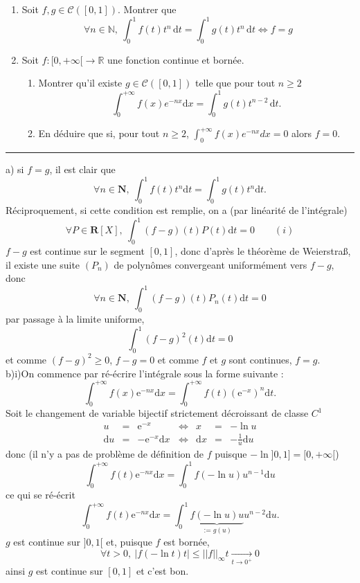 \documentclass[a4paper,12pt,reqno]{amsart}
\begin{document}
\begin{exo}
	\begin{enumerate}
	  \item Soit $f,g\in\mathcal{C}([0,1])$. Montrer que
	  \[
		\forall n\in\mathbb{N},\ \int_0^1f(t)t^n\,\mathrm{d}t=\int_0^1g(t)t^n\,\mathrm{d}t \Longleftrightarrow f=g
	  \]
	  \item Soit $f:[0,+\infty[\to\mathbb{R}$ une fonction continue et bornée.
	  \begin{enumerate}
		\item Montrer qu'il existe $g\in\mathcal{C}([0,1])$ telle que pour tout $n\geq 2$
		\[
		  \int_0^{+\infty}f(x)e^{-nx}\mathrm{d}x=\int_0^1g(t)t^{n-2}\,\mathrm{d}t.
		\]
		\item En déduire que si, pour tout $n\geq 2$, $\int_0^{+\infty} f(x)e^{-nx}dx=0$ alors $f=0$.
	  \end{enumerate}
	\end{enumerate}
  \end{exo}

\hrule

\vspace{1cm}
a) si $f=g$, il est clair que 
$$\forall n\in\mathbf N,\ \int_0^1f(t)t^n\mathrm dt=\int_0^1g(t)t^n\mathrm dt.$$
Réciproquement, si cette condition est remplie, on a (par linéarité de l'intégrale)
$$\forall P\in\mathbf R[X],\ \int_0^1(f-g)(t)P(t)\mathrm dt=0\qquad (i)$$
$f-g$ est continue sur le segment $[0,1]$, donc d'après le théorème de Weierstra\ss, il existe une suite $(P_n)$ de polynômes convergeant uniformément vers $f-g$, donc
$$\forall n\in\mathbf N,\ \int_0^1(f-g)(t)P_n(t)\mathrm dt=0$$
par passage à la limite uniforme,
$$\int_0^1(f-g)^2(t)\mathrm dt=0$$
et comme $(f-g)^2\geqslant 0$, $f-g=0$ et comme $f$ et $g$ sont continues, $f=g$.\\[1em]


b)i)On commence par ré-écrire l'intégrale sous la forme suivante :
$$\int_0^{+\infty}f(x)\mathrm e^{-nx}\mathrm dx=\int_0^{+\infty}f(t)\left(\mathrm e^{-x}\right)^n\mathrm dt.$$
Soit le changement de variable bijectif strictement décroissant de classe $C^1$
$$\begin{array}{rclcrcl}
	u&=&\mathrm e^{-x}\qquad&\Leftrightarrow&x&=&-\ln u\\
	\mathrm du&=&-\mathrm e^{-x}\mathrm dx&\Leftrightarrow&\mathrm dx&=&-\frac{1}{u}\mathrm du
\end{array}$$
donc (il n'y a pas de problème de définition de $f$ puisque $-\ln]0,1]=[0,+\infty[$)
$$\int_0^{+\infty}f(t)\mathrm e^{-nx}\mathrm dx=\int_0^1f(-\ln u)u^{n-1}\mathrm du$$
ce qui se ré-écrit
$$\int_0^{+\infty}f(t)\mathrm e^{-nx}\mathrm dx=\int_0^1\underbrace{f(-\ln u)u}_{:=g(u)}u^{n-2}\mathrm du.$$
$g$ est continue sur $]0,1[$ et, puisque $f$ est bornée, 
$$\forall t>0,\ |f(-\ln t)t|\leqslant ||f||_{\infty}t\underset{t\to 0^+}{\longrightarrow}0$$
ainsi $g$ est continue sur $[0,1]$ et c'est bon.
\end{document}
